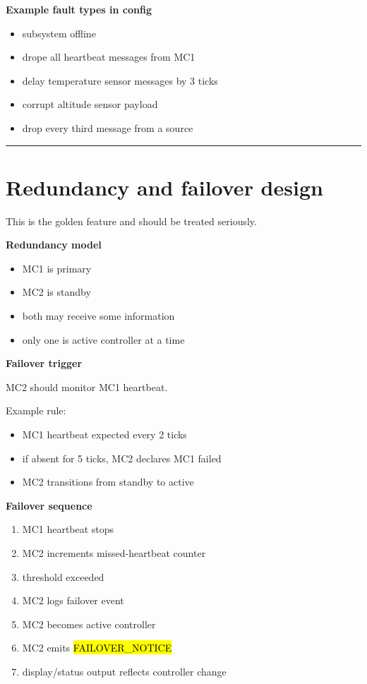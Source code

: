 \documentclass{report}
\begin{document}
\textbf{Example fault types in config}
\begin{itemize}
   \item subsystem offline
   \item drope all heartbeat messages from MC1
   \item delay temperature sensor messages by 3 ticks
   \item corrupt altitude sensor payload
   \item drop every third message from a source
\end{itemize}

\begin{center}
\rule{0.9\textwidth}{1pt}
\end{center}
\section{Redundancy and failover design}

This is the golden feature and should be treated seriously. 

\textbf{Redundancy model}
\begin{itemize}
   \item MC1 is primary
   \item MC2 is standby
   \item both may receive some information
   \item only one is active controller at a time
\end{itemize}

\textbf{Failover trigger}

MC2 should monitor MC1 heartbeat. 

Example rule:
\begin{itemize}
   \item MC1 heartbeat expected every 2 ticks
   \item if absent for 5 ticks, MC2 declares MC1 failed
   \item MC2 transitions from standby to active
\end{itemize}

\textbf{Failover sequence}
\begin{enumerate}
   \item MC1 heartbeat stops
   \item MC2 increments missed-heartbeat counter
   \item threshold exceeded
   \item MC2 logs failover event
   \item MC2 becomes active controller
   \item MC2 emits \hl{FAILOVER\_NOTICE}
   \item display/status output reflects controller change
\end{enumerate}
\end{document}
